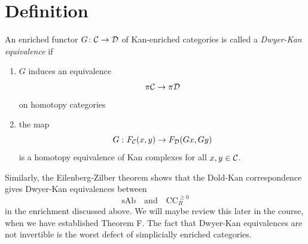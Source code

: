     \section{Definition}
        An enriched functor $G \colon \mathcal{C} \to \mathcal{D}$ of Kan-enriched categories is called a \emph{Dwyer-Kan equivalence} if
        \begin{enumerate}[label=\roman*)]
            \item 
                $G$ induces an equivalence
                \begin{equation*}
                    \pi \mathcal{C} \to \pi \mathcal{D}
                \end{equation*}
                on homotopy categories
            \item 
                the map
                \begin{equation*}
                    G \,\colon F_{\mathcal{C}}(x, y) \to F_{\mathcal{D}}(Gx, Gy)
                \end{equation*}
                is a homotopy equivalence of Kan complexes for all $x, y \in \mathcal{C}$.
        \end{enumerate}
        Similarly, the Eilenberg-Zilber theorem shows that the Dold-Kan correspondence gives Dwyer-Kan equivalences between
        \begin{equation*}
            \mathrm{sAb} \quad \text{and} \quad \mathrm{CC}^{\geqslant 0}_R
        \end{equation*}
        in the enrichment discussed above. We will maybe review this later in the course, when we have established Theorem F. The fact that Dwyer-Kan equivalences are not invertible is the worst defect of simplicially enriched categories.


